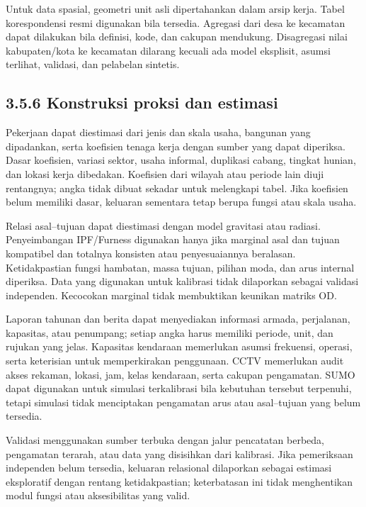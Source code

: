 \documentclass[
  indonesian,
  11pt,
  a4paper,
  oneside,
  openany]{report}
\begin{document}
Untuk data spasial, geometri unit asli dipertahankan dalam arsip kerja.
Tabel korespondensi resmi digunakan bila tersedia. Agregasi dari desa ke
kecamatan dapat dilakukan bila definisi, kode, dan cakupan mendukung.
Disagregasi nilai kabupaten/kota ke kecamatan dilarang kecuali ada model
eksplisit, asumsi terlihat, validasi, dan pelabelan sintetis.

\subsection{3.5.6 Konstruksi proksi dan
estimasi}\label{konstruksi-proksi-dan-estimasi}

Pekerjaan dapat diestimasi dari jenis dan skala usaha, bangunan yang
dipadankan, serta koefisien tenaga kerja dengan sumber yang dapat
diperiksa. Dasar koefisien, variasi sektor, usaha informal, duplikasi
cabang, tingkat hunian, dan lokasi kerja dibedakan. Koefisien dari
wilayah atau periode lain diuji rentangnya; angka tidak dibuat sekadar
untuk melengkapi tabel. Jika koefisien belum memiliki dasar, keluaran
sementara tetap berupa fungsi atau skala usaha.

Relasi asal--tujuan dapat diestimasi dengan model gravitasi atau
radiasi. Penyeimbangan IPF/Furness digunakan hanya jika marginal asal
dan tujuan kompatibel dan totalnya konsisten atau penyesuaiannya
beralasan. Ketidakpastian fungsi hambatan, massa tujuan, pilihan moda,
dan arus internal diperiksa. Data yang digunakan untuk kalibrasi tidak
dilaporkan sebagai validasi independen. Kecocokan marginal tidak
membuktikan keunikan matriks OD.

Laporan tahunan dan berita dapat menyediakan informasi armada,
perjalanan, kapasitas, atau penumpang; setiap angka harus memiliki
periode, unit, dan rujukan yang jelas. Kapasitas kendaraan memerlukan
asumsi frekuensi, operasi, serta keterisian untuk memperkirakan
penggunaan. CCTV memerlukan audit akses rekaman, lokasi, jam, kelas
kendaraan, serta cakupan pengamatan. SUMO dapat digunakan untuk simulasi
terkalibrasi bila kebutuhan tersebut terpenuhi, tetapi simulasi tidak
menciptakan pengamatan arus atau asal--tujuan yang belum tersedia.

Validasi menggunakan sumber terbuka dengan jalur pencatatan berbeda,
pengamatan terarah, atau data yang disisihkan dari kalibrasi. Jika
pemeriksaan independen belum tersedia, keluaran relasional dilaporkan
sebagai estimasi eksploratif dengan rentang ketidakpastian; keterbatasan
ini tidak menghentikan modul fungsi atau aksesibilitas yang valid.
\end{document}
